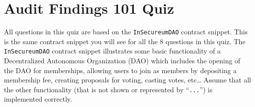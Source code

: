 \section{Audit Findings 101 Quiz}

All questions in this quiz are based on the \verb|InSecureumDAO| contract snippet.
This is the same contract snippet you will see for all the 8 questions in this quiz.
The \verb|InSecureumDAO| contract snippet illustrates some basic functionality of a Decentralized Autonomous Organization (DAO) which includes the opening of the DAO for memberships, allowing users to join as members by depositing a membership fee, creating proposals for voting, casting votes, etc\dots
Assume that all the other functionality (that is not shown or represented by ``\verb|...|'') is implemented correctly.

